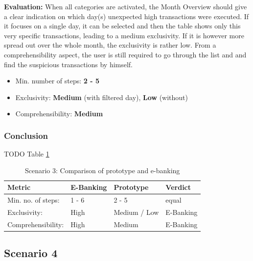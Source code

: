 \textbf{Evaluation:} When all categories are activated, the Month Overview should give a clear indication on which day(s) unexpected high transactions were executed. If it focuses on a single day, it can be selected and then the table shows only this very specific transactions, leading to a medium exclusivity. If it is however more spread out over the whole month, the exclusivity is rather low. From a comprehensibility aspect, the user is still required to go through the list and and find the suspicious transactions by himself.
\begin{itemize}[noitemsep,nolistsep]
	\item Min. number of steps: \textbf{2 - 5}
	\item Exclusivity: \textbf{Medium} (with filtered day), \textbf{Low} (without)
	\item Comprehensibility: \textbf{Medium}
\end{itemize}



\subsubsection{Conclusion}

TODO Table \ref{tbl:scenariothreecomparison}

\begin{table}[h]
	\begin{center}
		\begin{tabular}{ | p{3.2cm} | p{3.8cm} | p{3.5cm} | p{2.5cm} | }
			\hline
			\textbf{Metric} & \textbf{E-Banking} & \textbf{Prototype} & \textbf{Verdict} \\
			\hline
			Min. no. of steps: & 1 - 6 & 2 - 5 & equal \\
			\hline
			Exclusivity: & High & Medium / Low & E-Banking \\
			\hline
			Comprehensibility: & High & Medium & E-Banking \\
			\hline
		\end{tabular}
		\caption{Scenario 3: Comparison of prototype and e-banking}
		\label{tbl:scenariothreecomparison}
	\end{center}
\end{table}



\subsection{Scenario 4}

